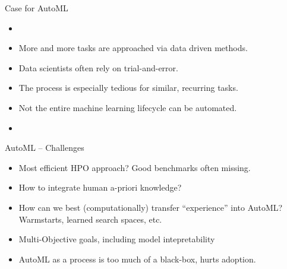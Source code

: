 \begin{frame}{Case for AutoML}

\hspace{-1cm}
\begin{minipage}{0.05\textwidth}
    \phantom{}
\end{minipage}
\begin{minipage}{0.5\textwidth}
    \begin{itemize}
        \item[]
        \item More and more tasks are approached via data driven methods.
        \item Data scientists often rely on trial-and-error.
        \item The process is especially tedious for similar, recurring tasks.
        \item Not the entire machine learning lifecycle can be automated.
        \item[]
    \end{itemize}
\end{minipage}


\end{frame}



\begin{frame}{AutoML -- Challenges}
\begin{itemize}
    \item Most efficient HPO approach? Good benchmarks often missing.
    \item How to integrate human a-priori knowledge?
    \item How can we best (computationally) transfer ``experience'' into AutoML?
    Warmstarts, learned search spaces, etc. 
    \item Multi-Objective goals, including model intepretability
    \item AutoML as a process is too much of a black-box, hurts adoption.
\end{itemize}
\end{frame}


\endlecture

